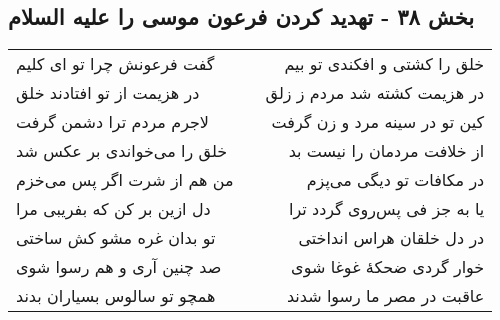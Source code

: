 \begin{center}
\section*{بخش ۳۸ - تهدید کردن فرعون موسی را علیه السلام}
\label{sec:sh038}
\begin{longtable}{l p{0.5cm} r}
گفت فرعونش چرا تو ای کلیم
&&
خلق را کشتی و افکندی تو بیم
\\
در هزیمت از تو افتادند خلق
&&
در هزیمت کشته شد مردم ز زلق
\\
لاجرم مردم ترا دشمن گرفت
&&
کین تو در سینه مرد و زن گرفت
\\
خلق را می‌خواندی بر عکس شد
&&
از خلافت مردمان را نیست بد
\\
من هم از شرت اگر پس می‌خزم
&&
در مکافات تو دیگی می‌پزم
\\
دل ازین بر کن که بفریبی مرا
&&
یا به جز فی پس‌روی گردد ترا
\\
تو بدان غره مشو کش ساختی
&&
در دل خلقان هراس انداختی
\\
صد چنین آری و هم رسوا شوی
&&
خوار گردی ضحکهٔ غوغا شوی
\\
همچو تو سالوس بسیاران بدند
&&
عاقبت در مصر ما رسوا شدند
\\
\end{longtable}
\end{center}
